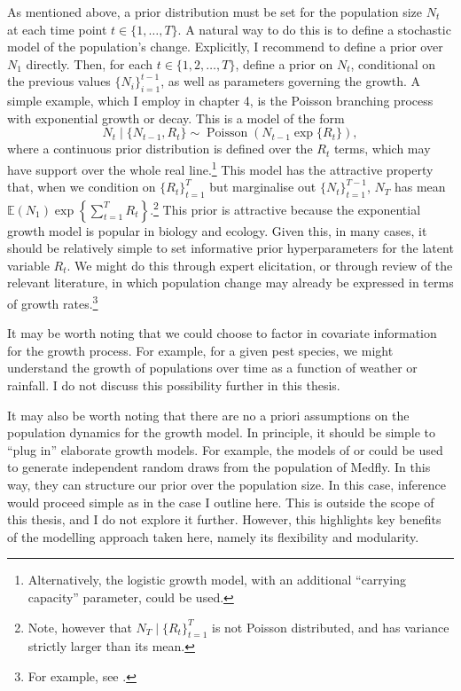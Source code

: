\documentclass[
  oneside]{book}
\begin{document}
As mentioned above, a prior distribution must be set for the population size \(N_t\) at each time point \(t \in \{1, \ldots, T\}\). A natural way to do this is to define a stochastic model of the population's change. Explicitly, I recommend to define a prior over \(N_1\) directly. Then, for each \(t \in \{1,2, \ldots, T\}\), define a prior on \(N_t\), conditional on the previous values \(\{N_i\}_{i=1}^{t-1}\), as well as parameters governing the growth. A simple example, which I employ in chapter 4, is the Poisson branching process with exponential growth or decay. This is a model of the form
\[
N_t \mid \{N_{t-1}, R_t\} \sim \operatorname{Poisson}(N_{t-1} \exp \{R_t\}),
\]
where a continuous prior distribution is defined over the \(R_t\) terms, which may have support over the whole real line.\footnote{Alternatively, the logistic growth model, with an additional ``carrying capacity'' parameter, could be used.} This model has the attractive property that, when we condition on \(\{R_t\}_{t=1}^T\) but marginalise out \(\{N_t\}_{t=1}^{T-1}\), \(N_T\) has mean \(\mathbb E(N_1) \exp \left\{ \sum_{t=1}^T R_t \right\}\).\footnote{Note, however that \(N_T \mid \{R_t\}_{t=1}^T\) is not Poisson distributed, and has variance strictly larger than its mean.} This prior is attractive because the exponential growth model is popular in biology and ecology. Given this, in many cases, it should be relatively simple to set informative prior hyperparameters for the latent variable \(R_t\). We might do this through expert elicitation, or through review of the relevant literature, in which population change may already be expressed in terms of growth rates.\footnote{For example, see \citet{papadopoulos2002}.}

It may be worth noting that we could choose to factor in covariate information for the growth process. For example, for a given pest species, we might understand the growth of populations over time as a function of weather or rainfall. I do not discuss this possibility further in this thesis.

It may also be worth noting that there are no a priori assumptions on the population dynamics for the growth model. In principle, it should be simple to ``plug in'' elaborate growth models. For example, the models of \citet{lux2018} or \citet{manoukis2014} could be used to generate independent random draws from the population of Medfly. In this way, they can structure our prior over the population size. In this case, inference would proceed simple as in the case I outline here. This is outside the scope of this thesis, and I do not explore it further. However, this highlights key benefits of the modelling approach taken here, namely its flexibility and modularity.
\end{document}
